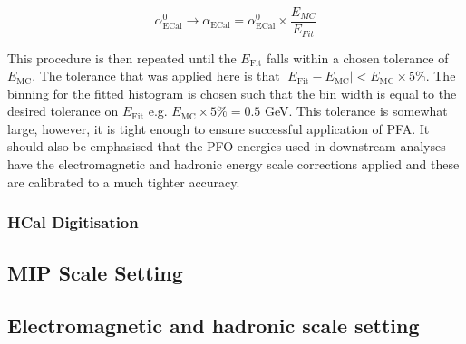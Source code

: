 \begin{equation}
\alpha^{0}_{\text{ECal}} \rightarrow \alpha_{\text{ECal}} = \alpha^{0}_{\text{ECal}} \times \frac{E_{MC}}{E_{Fit}}
\end{equation}

This procedure is then repeated until the $E_{\text{Fit}}$ falls within a chosen tolerance of $E_{\text{MC}}$.  The tolerance that was applied here is that $|E_{\text{Fit}} - E_{\text{MC}}| < E_{\text{MC}} \times 5 \%$.  The binning for the fitted histogram is chosen such that the bin width is equal to the desired tolerance on $E_{\text{Fit}}$ e.g. $E_{\text{MC}} \times 5 \% = 0.5$ GeV.  This tolerance is somewhat large, however, it is tight enough to ensure successful application of PFA.  It should also be emphasised that the PFO energies used in downstream analyses have the electromagnetic and hadronic energy scale corrections applied and these are  calibrated to a much tighter accuracy.

\subsubsection{HCal Digitisation}


\subsection{MIP Scale Setting}


\subsection{Electromagnetic and hadronic scale setting}




